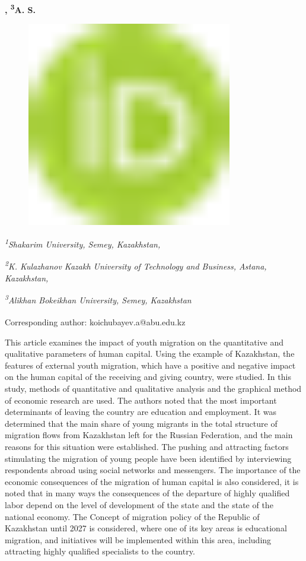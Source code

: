 {\bfseries , \textsuperscript{3}A. S.
\begin{figure}[H]
	\centering
	\includegraphics[width=0.8\textwidth]{media/ekon/image1}
	\caption*{}
\end{figure}


\emph{\textsuperscript{1}Shakarim University, Semey, Kazakhstan,}

\emph{\textsuperscript{2}K. Kulazhanov Kazakh University of Technology
and Business, Astana, Kazakhstan,}

\emph{\textsuperscript{3}Alikhan Bokeikhan University, Semey,
Kazakhstan}

\textsuperscript{\envelope }Corresponding author: koichubayev.a@abu.edu.kz

This article examines the impact of youth migration on the quantitative
and qualitative parameters of human capital. Using the example of
Kazakhstan, the features of external youth migration, which have a
positive and negative impact on the human capital of the receiving and
giving country, were studied. In this study, methods of quantitative and
qualitative analysis and the graphical method of economic research are
used. The authors noted that the most important determinants of leaving
the country are education and employment. It was determined that the
main share of young migrants in the total structure of migration flows
from Kazakhstan left for the Russian Federation, and the main reasons
for this situation were established. The pushing and attracting factors
stimulating the migration of young people have been identified by
interviewing respondents abroad using social networks and messengers.
The importance of the economic consequences of the migration of human
capital is also considered, it is noted that in many ways the
consequences of the departure of highly qualified labor depend on the
level of development of the state and the state of the national economy.
The Concept of migration policy of the Republic of Kazakhstan until 2027
is considered, where one of its key areas is educational migration, and
initiatives will be implemented within this area, including attracting
highly qualified specialists to the country.

}
